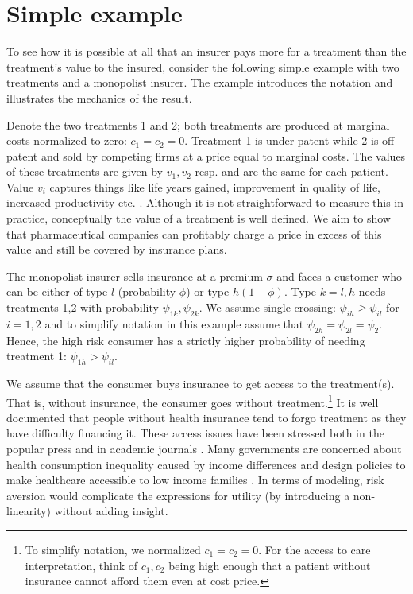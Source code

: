 \documentclass[12pt,english,a4paper]{article}
\begin{document}
\section{Simple example}
\label{sec:org42388eb}

To see how it is possible at all that an insurer pays more for a treatment than the treatment's value to the insured, consider the following simple example with two treatments and a monopolist insurer. The example introduces the notation and illustrates the mechanics of the result. 

Denote the two treatments 1 and 2; both treatments are produced at marginal costs normalized to zero: \(c_1 = c_2 =0\). Treatment 1 is under patent while 2 is off patent and sold by competing firms at a price equal to marginal costs. The values of these treatments are given by \(v_1,v_2\) resp. and are the same for each patient. Value \(v_i\) captures things like life years gained, improvement in quality of life, increased productivity etc. \citep{Garrison2017}. Although it is not straightforward to measure this in practice, conceptually the value of a treatment is well defined. We aim to show that pharmaceutical companies can profitably charge a price in excess of this value and still be covered by insurance plans.

The monopolist insurer sells insurance at a premium \(\sigma\) and faces a customer who can be either of type \(l\) (probability \(\phi\)) or type \(h (1-\phi)\). Type \(k=l,h\) needs treatments 1,2 with probability \(\psi_{1k},\psi_{2k}\). We assume single crossing: \(\psi_{ih} \geq \psi_{il}\) for \(i=1,2\) and to simplify notation in this example assume that \(\psi_{2h} = \psi_{2l} = \psi_2\). Hence, the high risk consumer has a strictly higher probability of needing treatment 1: \(\psi_{1h}>\psi_{il}\).

We assume that the consumer buys insurance to get access to the treatment(s). That is, without insurance, the consumer goes without treatment.\footnote{To simplify notation, we normalized \(c_1=c_2=0\). For the access to care interpretation, think of \(c_1,c_2\) being high enough that a patient without insurance cannot afford them even at cost price.} It is well documented that people without health insurance tend to forgo treatment as they have difficulty financing it. These access issues have been stressed both in the popular press \citep{Cohn07} and in academic journals \citep{Nyman1999141,Schoen2008,Schoen2010a}. Many governments are concerned about health consumption inequality caused by income differences and design policies to make healthcare accessible to low income families \citep{Schokkaert2011o}. In terms of modeling, risk aversion would complicate the expressions for utility (by introducing a non-linearity) without adding insight.
\end{document}

